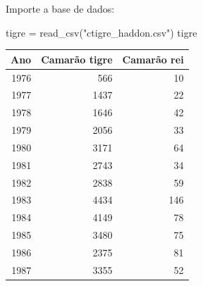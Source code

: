 \documentclass[
]{book}
\newenvironment{Shaded}{\begin{snugshade}}{\end{snugshade}}
\newcommand{\FunctionTok}[1]{\textcolor[rgb]{0.00,0.00,0.00}{#1}}
\newcommand{\NormalTok}[1]{#1}
\newcommand{\OtherTok}[1]{\textcolor[rgb]{0.56,0.35,0.01}{#1}}
\newcommand{\StringTok}[1]{\textcolor[rgb]{0.31,0.60,0.02}{#1}}
\begin{document}
Importe a base de dados:

\begin{Shaded}
\begin{Highlighting}[]
\NormalTok{tigre }\OtherTok{=} \FunctionTok{read\_csv}\NormalTok{(}\StringTok{"ctigre\_haddon.csv"}\NormalTok{)}
\NormalTok{tigre}
\end{Highlighting}
\end{Shaded}

\begin{tabular}{r|r|r}
\hline
Ano & Camarão tigre & Camarão rei\\
\hline
1976 & 566 & 10\\
\hline
1977 & 1437 & 22\\
\hline
1978 & 1646 & 42\\
\hline
1979 & 2056 & 33\\
\hline
1980 & 3171 & 64\\
\hline
1981 & 2743 & 34\\
\hline
1982 & 2838 & 59\\
\hline
1983 & 4434 & 146\\
\hline
1984 & 4149 & 78\\
\hline
1985 & 3480 & 75\\
\hline
1986 & 2375 & 81\\
\hline
1987 & 3355 & 52\\
\hline
\end{tabular}
\end{document}
